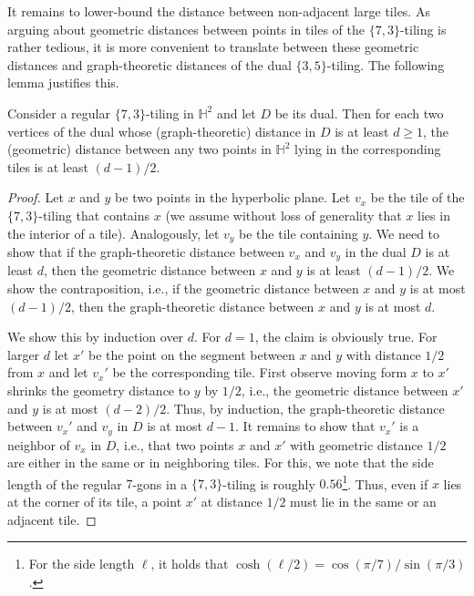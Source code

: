 \documentclass[a4paper,english,cleveref,thm-restate]{lipics-v2021}
\newcommand{\Hyp}{\ensuremath{\mathbb{H}}\xspace}
\begin{document}
It remains to lower-bound the distance between non-adjacent large tiles.
As arguing about geometric distances between points in tiles of the $\{7, 3\}$-tiling is rather tedious, it is more convenient to translate between these geometric distances and graph-theoretic distances of the dual $\{3, 5\}$-tiling.
The following lemma justifies this.

\begin{lemma}\label{lem:geometric_graph_distances}
    Consider a regular $ \{ 7, 3 \} $-tiling in $ \Hyp^2 $ and let $ D $ be its dual.
    Then for each two vertices of the dual whose (graph-theoretic) distance in $ D $ is at least $d \geq 1 $, the (geometric) distance between any two points in $ \Hyp^2 $ lying in the corresponding tiles is at least $ (d - 1) / 2 $.
\end{lemma}

\begin{proof}
    Let $x$ and $y$ be two points in the hyperbolic plane.
    Let $v_x$ be the tile of the $\{7, 3\}$-tiling that contains $x$ (we assume without loss of generality that $x$ lies in the interior of a tile).
    Analogously, let $v_y$ be the tile containing $y$.
    We need to show that if the graph-theoretic distance between $v_x$ and $v_y$ in the dual $D$ is at least $d$, then the geometric distance between $x$ and $y$ is at least $(d - 1) / 2$.
    We show the contraposition, i.e., if the geometric distance between $x$ and $y$ is at most $(d - 1) / 2$, then the graph-theoretic distance between $x$ and $y$ is at most $d$.

    We show this by induction over $d$.
    For $d = 1$, the claim is obviously true.
    For larger $d$ let $x'$ be the point on the segment between $x$ and $y$ with distance $1/2$ from $x$ and let $v_x'$ be the corresponding tile.
    First observe moving form $x$ to $x'$ shrinks the geometry distance to $y$ by $1/2$, i.e., the geometric distance between $x'$ and $y$ is at most $(d - 2) / 2$.
    Thus, by induction, the graph-theoretic distance between $v_x'$ and $v_y$ in $D$ is at most $d - 1$.
    It remains to show that $v_x'$ is a neighbor of $v_x$ in $D$, i.e., that two points $x$ and $x'$ with geometric distance $1/2$ are either in the same or in neighboring tiles.
    For this, we note that the side length of the regular $7$-gons in a $\{7, 3\}$-tiling is roughly $0.56$\footnote{For the side length $\ell$, it holds that $\cosh(\ell / 2) = \cos(\pi / 7) / \sin(\pi / 3)$.}.
    Thus, even if $x$ lies at the corner of its tile, a point $x'$ at distance $1/2$ must lie in the same or an adjacent tile.
\end{proof}
\end{document}
